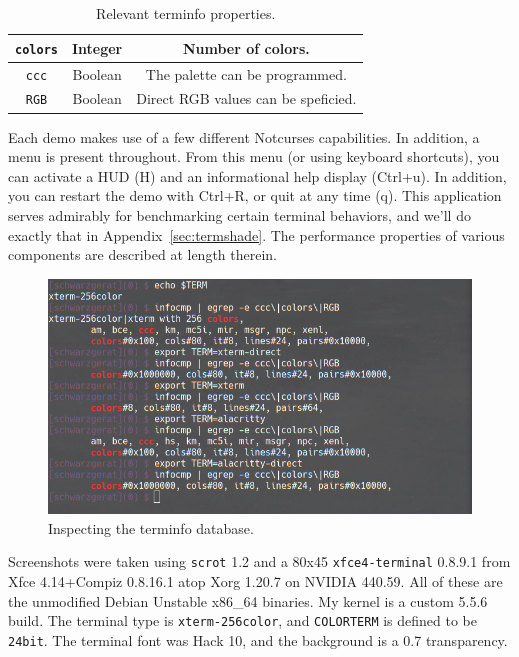\documentclass[letterpaper,10pt]{article}
\begin{document}
\begin{table}[h]
  \begin{center}
    \begin{tabular}{ |c|c|c| }
      \hline
      \texttt{colors} & Integer & Number of colors. \\
      \hline
      \texttt{ccc} & Boolean & The palette can be programmed. \\
      \hline
      \texttt{RGB} & Boolean & Direct RGB values can be speficied. \\
      \hline
    \end{tabular}
  \end{center}
  \caption{Relevant terminfo properties.}
  \label{table:terminfo}
\end{table}

Each demo makes use of a few different Notcurses capabilities. In addition,
a menu is present throughout. From this menu (or using keyboard shortcuts),
you can activate a HUD (H) and an informational help display (Ctrl+u). In
addition, you can restart the demo with Ctrl+R, or quit at any time (q). This
application serves admirably for benchmarking certain terminal behaviors, and
we'll do exactly that in Appendix~\ref{sec:termshade}. The performance
properties of various components are described at length therein.

\begin{figure}[h]
  \centering
  \includegraphics[width=.75\linewidth]{media/terminfocmp.png}
  \caption{Inspecting the terminfo database.}
  \label{fig:terminfocmp}
\end{figure}

Screenshots were taken using \texttt{scrot} 1.2 and a 80x45
\texttt{xfce4-terminal} 0.8.9.1 from Xfce 4.14+Compiz 0.8.16.1 atop Xorg
1.20.7 on NVIDIA 440.59. All of these are the unmodified Debian Unstable
x86\_64 binaries. My kernel is a custom 5.5.6 build. The terminal type is
\texttt{xterm-256color}, and \texttt{COLORTERM} is defined to be
\texttt{24bit}. The terminal font was Hack 10, and the background is a 0.7
transparency.
\end{document}
